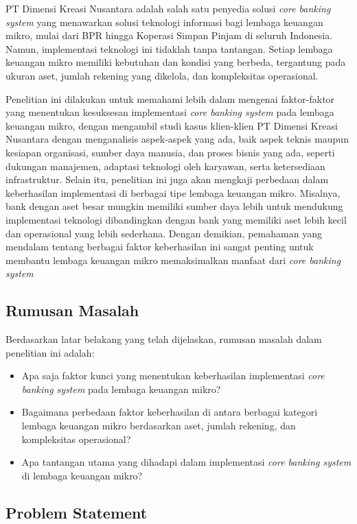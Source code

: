 \documentclass[journal,article,submit,pdftex,moreauthors]{Definitions/mdpi}
\begin{document}
PT Dimensi Kreasi Nusantara adalah salah satu penyedia solusi \textit{core banking system} yang menawarkan solusi teknologi informasi bagi lembaga keuangan mikro, mulai dari BPR hingga Koperasi Simpan Pinjam di seluruh Indonesia. Namun, implementasi teknologi ini tidaklah tanpa tantangan. Setiap lembaga keuangan mikro memiliki kebutuhan dan kondisi yang berbeda, tergantung pada ukuran aset, jumlah rekening yang dikelola, dan kompleksitas operasional.

Penelitian ini dilakukan untuk memahami lebih dalam mengenai faktor-faktor yang menentukan kesuksesan implementasi \textit{core banking system} pada lembaga keuangan mikro, dengan mengambil studi kasus klien-klien PT Dimensi Kreasi Nusantara dengan menganalisis aspek-aspek yang ada, baik aspek teknis maupun kesiapan organisasi, sumber daya manusia, dan proses bisnis yang ada, seperti dukungan manajemen, adaptasi teknologi oleh karyawan, serta ketersediaan infrastruktur. Selain itu, penelitian ini juga akan mengkaji perbedaan dalam keberhasilan implementasi di berbagai tipe lembaga keuangan mikro. Misalnya, bank dengan aset besar mungkin memiliki sumber daya lebih untuk mendukung implementasi teknologi dibandingkan dengan bank yang memiliki aset lebih kecil dan operasional yang lebih sederhana. Dengan demikian, pemahaman yang mendalam tentang berbagai faktor keberhasilan ini sangat penting untuk membantu lembaga keuangan mikro memaksimalkan manfaat dari \textit{core banking system}

\subsection{Rumusan Masalah}

Berdasarkan latar belakang yang telah dijelaskan, rumusan masalah dalam penelitian ini adalah:
\begin{itemize}
    \item Apa saja faktor kunci yang menentukan keberhasilan implementasi \textit{core banking system} pada lembaga keuangan mikro?
    \item Bagaimana perbedaan faktor keberhasilan di antara berbagai kategori lembaga keuangan mikro berdasarkan aset, jumlah rekening, dan kompleksitas operasional?
    \item Apa tantangan utama yang dihadapi dalam implementasi \textit{core banking system} di lembaga keuangan mikro?
\end{itemize}

\subsection{Problem Statement}
\end{document}
